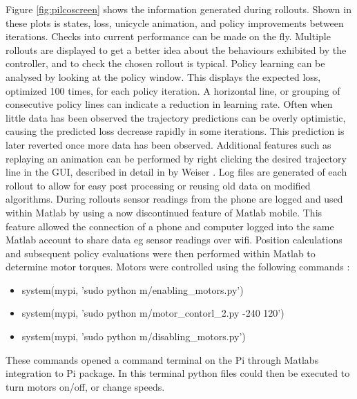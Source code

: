 \documentclass[twoside,twocolumn,12pt]{article}
\begin{document}
Figure \ref{fig:pilcoscreen} shows the information generated during rollouts. Shown in these plots is  states, loss, unicycle animation, and policy improvements between iterations. Checks into current performance can be made on the fly. Multiple rollouts are displayed to get a better idea about the behaviours exhibited by the controller, and to check the chosen rollout is typical. 
Policy learning can be analysed by looking at the policy window. This displays the expected loss, optimized 100 times, for each policy iteration. A horizontal line, or grouping of consecutive policy lines can indicate a reduction in learning rate. Often when little data has been observed the trajectory predictions can be overly optimistic, causing the predicted loss decrease rapidly in some iterations. This prediction is later reverted once more data has been observed.
\newline
Additional features such as replaying an animation can be performed by right clicking the desired trajectory line in the GUI, described in detail in by Weiser \cite{eric}. 
Log files are generated of each rollout to allow for easy post processing or reusing old data on modified algorithms.
\newline
During rollouts sensor readings from the phone are logged and used within Matlab by using a now discontinued feature of Matlab mobile. This feature allowed the connection of a phone and computer logged into the same Matlab account to share data eg sensor readings over wifi.
\newline
Position calculations and subsequent policy evaluations were then performed within Matlab to determine motor torques. Motors were controlled using the following commands \cite{arsalan} \cite{motorcmd}: 
\begin{itemize}
\item system(mypi, 'sudo python m/enabling\_motors.py')
\item system(mypi, 'sudo python m/motor\_contorl\_2.py -240 120')
\item system(mypi, 'sudo python m/disabling\_motors.py')
\end{itemize}
These commands opened a command terminal on the Pi through Matlabs integration to Pi package. In this terminal python files could then be executed to turn motors on/off, or change speeds.
\end{document}
